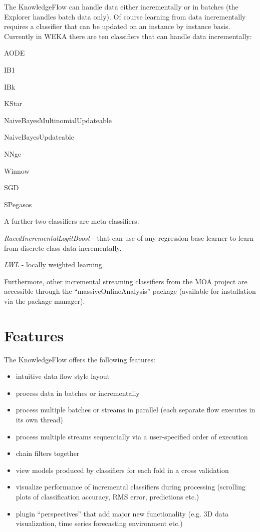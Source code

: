 The KnowledgeFlow can handle data either incrementally or in batches
(the Explorer handles batch data only). Of course learning from data
incrementally requires a classifier that can be updated on an instance
by instance basis. Currently in WEKA there are ten classifiers that
can handle data incrementally:
\begin{tight_itemize}
	\item AODE
	\item IB1
	\item IBk
	\item KStar
	\item NaiveBayesMultinomialUpdateable
	\item NaiveBayesUpdateable
	\item NNge
	\item Winnow
        \item SGD
        \item SPegasos
\end{tight_itemize}

\noindent A further two classifiers are meta classifiers:
\begin{tight_itemize}
	\item \textit{RacedIncrementalLogitBoost} - that can use of any regression base
learner to learn from discrete class data incrementally.
	\item \textit{LWL} - locally weighted learning.
\end{tight_itemize}

Furthermore, other incremental streaming classifiers from the MOA
project are accessible through the ``massiveOnlineAnalysis'' package
(available for installation via the package manager).


\newpage
\section{Features}

The KnowledgeFlow offers the following features:
\begin{itemize}
	\item intuitive data flow style layout
	\item process data in batches or incrementally 
	\item process multiple batches or streams in parallel (each separate flow 
  	executes in its own thread)
        \item process multiple streams sequentially via a user-specified order of
          execution
	\item chain filters together
	\item view models produced by classifiers for each fold in a cross validation
	\item visualize performance of incremental classifiers during 
  	processing (scrolling plots of classification accuracy, RMS error, 
  	predictions etc.)
        \item plugin ``perspectives'' that add major new functionality (e.g. 3D data visualization, 
          time series forecasting environment etc.)
\end{itemize}

